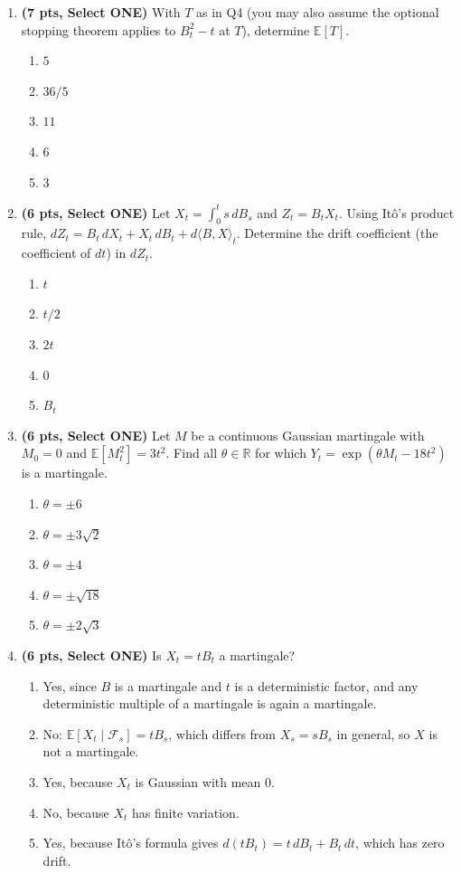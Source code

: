 \documentclass[11pt]{article}
\newcommand{\R}{\mathbb{R}}
\newcommand{\E}{\mathbb{E}}
\begin{document}
\begin{enumerate}
\item[\textbf{Q5.}] \textbf{(7 pts, Select ONE)} With $T$ as in Q4 (you may also assume the optional stopping theorem applies to $B_t^2-t$ at $T$), determine $\E[T]$.
\begin{enumerate}
  \item $5$
  \item $36/5$
  \item $11$
  \item $6$
  \item $3$
\end{enumerate}

\item[\textbf{Q6.}] \textbf{(6 pts, Select ONE)} Let $X_t=\int_0^ts\,dB_s$ and $Z_t=B_tX_t$. Using It\^o's product rule, $dZ_t=B_t\,dX_t+X_t\,dB_t+d\langle B,X\rangle_t$. Determine the drift coefficient (the coefficient of $dt$) in $dZ_t$.
\begin{enumerate}
  \item $t$
  \item $t/2$
  \item $2t$
  \item $0$
  \item $B_t$
\end{enumerate}

\item[\textbf{Q7.}] \textbf{(6 pts, Select ONE)} Let $M$ be a continuous Gaussian martingale with $M_0=0$ and $\E[M_t^2]=3t^2$. Find all $\theta\in\R$ for which $Y_t=\exp(\theta M_t-18t^2)$ is a martingale.
\begin{enumerate}
  \item $\theta=\pm6$
  \item $\theta=\pm3\sqrt2$
  \item $\theta=\pm4$
  \item $\theta=\pm\sqrt{18}$
  \item $\theta=\pm2\sqrt3$
\end{enumerate}

\item[\textbf{Q8.}] \textbf{(6 pts, Select ONE)} Is $X_t=tB_t$ a martingale?
\begin{enumerate}
  \item Yes, since $B$ is a martingale and $t$ is a deterministic factor, and any deterministic multiple of a martingale is again a martingale.
  \item No: $\E[X_t\mid\mathcal F_s]=tB_s$, which differs from $X_s=sB_s$ in general, so $X$ is not a martingale.
  \item Yes, because $X_t$ is Gaussian with mean $0$.
  \item No, because $X_t$ has finite variation.
  \item Yes, because It\^o's formula gives $d(tB_t)=t\,dB_t+B_t\,dt$, which has zero drift.
\end{enumerate}


\end{enumerate}
\end{document}
